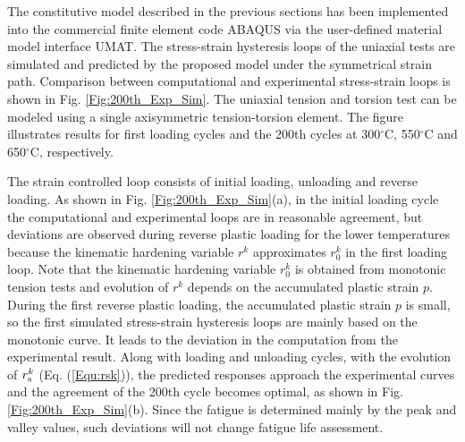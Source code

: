 \documentclass[preprint,5p,twocolumn,11pt,sort&compress]{elsarticle}
\begin{document}
\begin{figure*}
\caption{Comparison of the stress-strain hysteresis loops from experiments and computations  under isothermal uniaxial tensile loading conditions at 300$^{\circ}$C, 550$^{\circ}$C and 650$^{\circ}$C, respectively. (a) The first loading cycle. (b) The 200th. cycle.}
\label{Fig:200th_Exp_Sim}
\end{figure*}

\noindent
The constitutive model described in the previous sections has been implemented into the commercial finite element code  ABAQUS via the user-defined material model interface UMAT. 
The stress-strain hysteresis loops of the uniaxial tests are simulated and predicted by the proposed model under the symmetrical strain path.
Comparison between computational and experimental stress-strain loops is shown in Fig. \ref{Fig:200th_Exp_Sim}. The uniaxial tension and torsion test can be modeled using a single axisymmetric tension-torsion element.
The figure illustrates results for first loading cycles and the 200th cycles at 300$^{\circ}$C, 550$^{\circ}$C and 650$^{\circ}$C, respectively.

The strain controlled loop consists of initial loading, unloading and reverse loading.
As shown in Fig. \ref{Fig:200th_Exp_Sim}(a), in the initial loading cycle the computational and experimental loops are in reasonable agreement, but deviations are observed during reverse plastic loading for the lower temperatures because the kinematic hardening variable $r^k$ approximates ${r_0^k}$ in the first loading loop.
Note that the kinematic hardening variable ${r_0^k}$ is obtained from monotonic tension tests and evolution of $r^k$ depends on the accumulated plastic strain $p$.
During the first reverse plastic loading, the accumulated plastic strain $p$ is small, so the first simulated stress-strain hysteresis loops are mainly based on the monotonic curve. It leads to the deviation in the computation from the experimental result.
Along with loading and unloading cycles, with the evolution of $r_{\rm s}^k$ (Eq. (\ref{Equ:rsk})), the predicted responses approach the experimental curves and the agreement of the 200th cycle becomes optimal, as shown in Fig. \ref{Fig:200th_Exp_Sim}(b). Since the fatigue is determined mainly by the peak and valley values, such deviations will not change fatigue life assessment.
\end{document}
